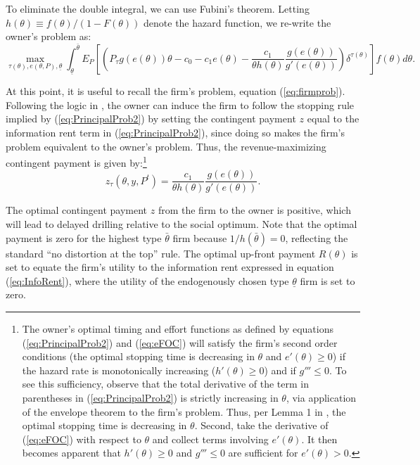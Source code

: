 \documentclass[12pt]{article}
\begin{document}
To eliminate the double integral, we can use Fubini's theorem. Letting $h(\theta)\equiv f(\theta)/(1-F(\theta))$ denote the hazard function, we re-write the owner's problem as:
\begin{equation}
\max_{\tau(\theta),e(\theta,P),\underline{\theta}} \int_{\underline{\theta}}^{\bar\theta} E_P\left[\left(P_\tau g(e(\theta))\theta - c_0 - c_1e(\theta) - \frac{c_1}{\theta h(\theta)} \frac{g(e(\theta))}{g'(e(\theta))}\right)\delta^{\tau(\theta)}\right]f(\theta)d\theta. \label{eq:PrincipalProb2}
\end{equation}

At this point, it is useful to recall the firm's problem, equation (\ref{eq:firmprob}). Following the logic in \citet{bib:board}, the owner can induce the firm to follow the stopping rule implied by (\ref{eq:PrincipalProb2}) by setting the contingent payment $z$ equal to the information rent term in (\ref{eq:PrincipalProb2}), since doing so makes the firm's problem equivalent to the owner's problem. Thus, the revenue-maximizing contingent payment is given by:\footnote{The owner's optimal timing and effort functions as defined by equations (\ref{eq:PrincipalProb2}) and (\ref{eq:eFOC}) will satisfy the firm's second order conditions (the optimal stopping time is decreasing in $\theta$ and $e'(\theta)\geq0$) if the hazard rate is monotonically increasing ($h'(\theta)\geq0$) and if $g'''\leq0$. To see this sufficiency, observe that the total derivative of the term in parentheses in (\ref{eq:PrincipalProb2}) is strictly increasing in $\theta$, via application of the envelope theorem to the firm's problem. Thus, per Lemma 1 in \citet{bib:board}, the optimal stopping time is decreasing in $\theta$. Second, take the derivative of (\ref{eq:eFOC}) with respect to $\theta$ and collect terms involving $e'(\theta)$. It then becomes apparent that $h'(\theta)\geq0$ and $g'''\leq0$ are sufficient for $e'(\theta)>0$.}
\begin{equation}
z_\tau(\theta,y,P^t) = \frac{c_1}{\theta h(\theta)}\frac{g(e(\theta))}{g'(e(\theta))}. \label{eq:ContPayment}
\end{equation}

The optimal contingent payment $z$ from the firm to the owner is positive, which will lead to delayed drilling relative to the social optimum. Note that the optimal payment is zero for the highest type $\bar{\theta}$ firm because $1/h(\bar{\theta})=0$, reflecting the standard ``no distortion at the top'' rule. The optimal up-front payment $R(\theta)$ is set to equate the firm's utility to the information rent expressed in equation (\ref{eq:InfoRent}), where the utility of the endogenously chosen type $\underline{\theta}$ firm is set to zero.
\end{document}
